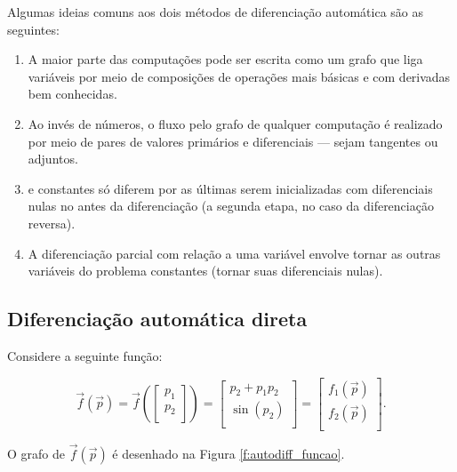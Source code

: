     Algumas ideias comuns aos dois métodos de diferenciação automática são as seguintes:
    \begin{enumerate}
      \item A maior parte das computações pode ser escrita como um grafo que liga variáveis por meio de composições de operações mais básicas e com derivadas bem conhecidas.
      \item Ao invés de números, o fluxo pelo grafo de qualquer computação é realizado por meio de pares de valores primários e diferenciais --- sejam tangentes ou adjuntos.
      \item \DIFdelbegin {}\DIFdelend \DIFaddbegin {}\DIFaddend e constantes só diferem por as últimas serem inicializadas com diferenciais nulas no antes da diferenciação (a segunda etapa, no caso da diferenciação reversa).
      \item A diferenciação parcial com relação a uma variável envolve tornar as outras variáveis do problema constantes (tornar suas diferenciais nulas).
    \end{enumerate}

    \subsection{Diferenciação automática direta}

      Considere a seguinte função:

      \begin{equation} \label{e:autodiff_direta_exemplo}
        \vec{f}(\vec{p}) = \vec{f}\left(
        \begin{bmatrix}
          p_1 \\
          p_2 \\
        \end{bmatrix}
        \right) =
        \begin{bmatrix}
          p_2 + p_1 p_2 \\
          \sin(p_2) \\
        \end{bmatrix} =
        \begin{bmatrix}
          f_1(\vec{p}) \\
          f_2(\vec{p}) \\
        \end{bmatrix}
        .
      \end{equation}

      \noindent O grafo de $\vec{f}(\vec{p})$ é desenhado na Figura \ref{f:autodiff_funcao}. \DIFaddbegin {}\DIFaddend 

